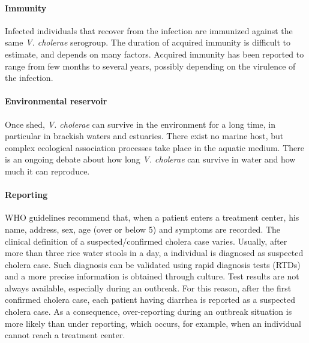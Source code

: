 \paragraph{Immunity} Infected individuals that recover from the infection are immunized against the same \textit{V. cholerae} serogroup. The duration of acquired immunity is difficult to estimate, and depends on many factors. Acquired immunity has been reported to range from few months to several years, possibly depending on the virulence of the infection\cite{Levine:DurationInfectionDerivedImmunity:1981,King:InapparentInfectionsCholera:2008,Kaper:Cholera:1995,Woodward:CholeraReinfectionMan:1971,Glass:SeroepidemiologicalStudiesEI:1985,Clemens:BiotypeDeterminantNatural:1991}.

\paragraph{Environmental reservoir} Once shed, \textit{V. cholerae} can survive in the environment for a long time, in particular in brackish waters and estuaries. There exist no marine host, but complex ecological association processes take place in the aquatic medium\cite{Reidl:VibrioCholeraeCholera:2002,Bertuzzo:SpacetimeEvolutionCholera:2008}. There is an ongoing debate about how long  \textit{V. cholerae} can survive in water and how much it can reproduce.

\paragraph{Reporting} WHO guidelines recommend that, when a patient enters a treatment center, his name, address, sex, age (over or below 5) and symptoms are recorded\cite{WHO:FirstStepsManaging:2010}. The clinical definition of a suspected/confirmed cholera case varies. Usually, after more than three rice water stools in a day, a individual is diagnosed as suspected cholera case. Such diagnosis can be validated using rapid diagnosis tests (RTDs) and a more precise information is obtained through culture. Test results are not always available, especially during an outbreak. For this reason, after the first confirmed cholera case, each patient having diarrhea is reported as a suspected cholera case.  As a consequence, over-reporting during an outbreak situation is more likely than under reporting, which occurs, for example, when an individual cannot reach a treatment center.  %

